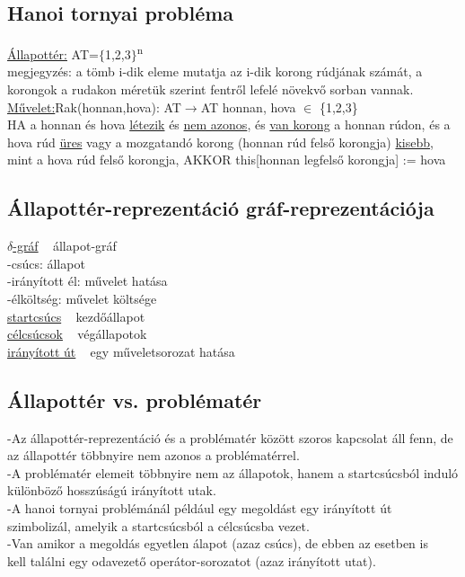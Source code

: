 \documentclass{article}
\begin{document}
	\subsection{Hanoi tornyai probléma}
	
	\underline{Állapottér:}
	AT=$\{$1,2,3$\}$\textsuperscript{n}\\
	megjegyzés: a tömb i-dik eleme mutatja az i-dik korong rúdjának számát, a korongok a rudakon méretük szerint fentről lefelé növekvő sorban vannak.\\	
	\underline{Művelet:}Rak(honnan,hova): AT$\rightarrow$AT honnan, hova $\in$ \{1,2,3\}\\
	HA a honnan és hova \underline{létezik} és \underline{nem azonos}, és \underline{van korong} a honnan rúdon, és a hova rúd \underline{üres} vagy a mozgatandó korong (honnan rúd felső korongja) \underline{kisebb}, mint a hova rúd felső korongja, AKKOR this[honnan legfelső korongja] := hova
	
	\subsection{Állapottér-reprezentáció gráf-reprezentációja}
	\underline{$\delta$-gráf} ~ állapot-gráf\\
	-csúcs: állapot\\
	-irányított él: művelet hatása\\
	-élköltség: művelet költsége\\
	\underline{startcsúcs} ~ kezdőállapot\\
	\underline{célcsúcsok} ~ végállapotok\\
	\underline{irányított út} ~ egy műveletsorozat hatása\\
	
	\subsection{Állapottér vs. problématér}
	-Az állapottér-reprezentáció és a problématér között szoros kapcsolat áll fenn, de az állapottér többnyire nem azonos a problématérrel.\\
	-A problématér elemeit többnyire nem az állapotok, hanem a startcsúcsból induló különböző hosszúságú irányított utak.\\
	\hspace*{1em} -A hanoi tornyai problémánál például egy megoldást egy irányított út\\ \hspace*{1em} szimbolizál, amelyik a startcsúcsból a célcsúcsba vezet.\\
	\hspace*{1em} -Van amikor a megoldás egyetlen álapot (azaz csúcs), de ebben az esetben is\\ \hspace*{1em} kell találni egy odavezető operátor-sorozatot (azaz irányított utat).
	 
\end{document}

